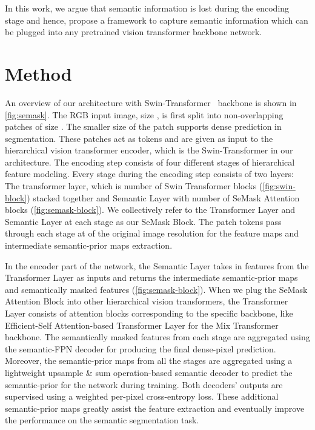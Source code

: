 \documentclass[10pt,twocolumn,letterpaper]{article}
\begin{document}
In this work, we argue that semantic information is lost during the encoding stage and hence, propose a framework to capture semantic information which can be plugged into any pretrained vision transformer backbone network. \section{Method}
An overview of our architecture with Swin-Transformer~\cite{swin-T} backbone is shown in \cref{fig:semask}. The RGB input image, size , is first split into non-overlapping patches of size . The smaller size of the patch supports dense prediction in segmentation. These patches act as tokens and are given as input to the hierarchical vision transformer encoder, which is the Swin-Transformer \cite{swin-T} in our architecture. The encoding step consists of four different stages of hierarchical feature modeling. Every stage during the encoding step consists of two layers: The transformer layer, which is  number of Swin Transformer blocks (\cref{fig:swin-block}) stacked together and Semantic Layer with   number of SeMask Attention blocks (\cref{fig:semask-block}). We collectively refer to the Transformer Layer and Semantic Layer at each stage as our SeMask Block. The patch tokens pass through each stage at  of the original image resolution for the feature maps and intermediate semantic-prior maps extraction.

In the encoder part of the network, the Semantic Layer takes in features from the Transformer Layer as inputs and returns the intermediate semantic-prior maps and semantically masked features (\cref{fig:semask-block}). When we plug the SeMask Attention Block into other hierarchical vision transformers, the Transformer Layer consists of attention blocks corresponding to the specific backbone, like Efficient-Self Attention-based Transformer Layer for the Mix Transformer~\cite{segformer} backbone. The semantically masked features from each stage are aggregated using the semantic-FPN \cite{sem-fpn} decoder for producing the final dense-pixel prediction. Moreover, the semantic-prior maps from all the stages are aggregated using a lightweight upsample \& sum operation-based semantic decoder to predict the semantic-prior for the network during training. Both decoders' outputs are supervised using a weighted per-pixel cross-entropy loss. These additional semantic-prior maps greatly assist the feature extraction and eventually improve the performance on the semantic segmentation task.
\end{document}
